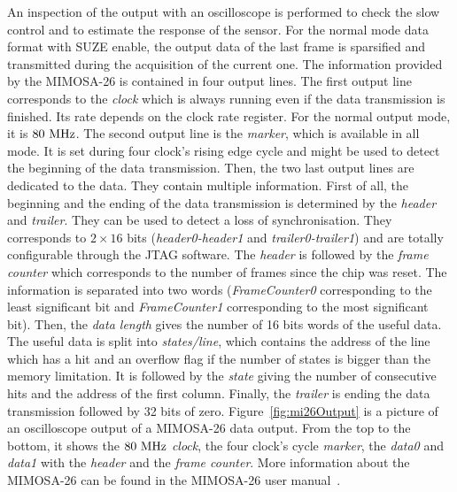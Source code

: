   An inspection of the output with an oscilloscope is performed to check the slow control and to estimate the response of the sensor.
  For the normal mode data format with \gls{SUZE} enable, the output data of the last frame is sparsified and transmitted during the acquisition of the current one.
  The information provided by the \gls{MIMOSA}-26 is contained in four output lines.
  The first output line corresponds to the \textit{clock} which is always running even if the data transmission is finished. 
  Its rate depends on the clock rate register. 
  For the normal output mode, it is $80~\rm{MHz}$.
  The second output line is the \textit{marker}, which is available in all mode.
  It is set during four clock's rising edge cycle and might be used to detect the beginning of the data transmission.
  Then, the two last output lines are dedicated to the data.
  They contain multiple information.
  First of all, the beginning and the ending of the data transmission is determined by the \textit{header} and \textit{trailer}.
  They can be used to detect a loss of synchronisation.
  They corresponds to $2 \times 16$ bits (\textit{header0-header1} and \textit{trailer0-trailer1}) and are totally configurable through the \gls{JTAG} software.
  The \textit{header} is followed by the \textit{frame counter} which corresponds to the number of frames since the chip was reset. 
  The information is separated into two words (\textit{FrameCounter0} corresponding to the least significant bit and \textit{FrameCounter1} corresponding to the most significant bit).
  Then, the \textit{data length} gives the number of 16 bits words of the useful data. 
  The useful data is split into \textit{states/line}, which contains the address of the line which has a hit and an overflow flag if the number of states is bigger than the memory limitation.
  It is followed by the \textit{state} giving the number of consecutive hits and the address of the first column.
  Finally, the \textit{trailer} is ending the data transmission followed by 32 bits of zero.
  Figure~\ref{fig:mi26Output} is a picture of an oscilloscope output of a \gls{MIMOSA}-26 data output. From the top to the bottom, it shows the $80~\rm{MHz}$ \textit{clock}, the four clock's cycle \textit{marker}, the \textit{data0} and \textit{data1} with the \textit{header} and the \textit{frame counter}.
  More information about the \gls{MIMOSA}-26 can be found in the \gls{MIMOSA}-26 user manual~\cite{manualMi26}.

